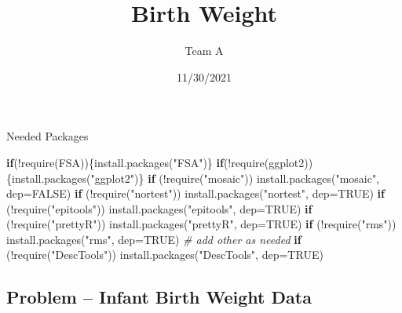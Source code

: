 \documentclass[
]{article}
\title{Birth Weight}
\author{Team A}
\date{11/30/2021}
\newenvironment{Shaded}{\begin{snugshade}}{\end{snugshade}}
\newcommand{\AttributeTok}[1]{\textcolor[rgb]{0.77,0.63,0.00}{#1}}
\newcommand{\CommentTok}[1]{\textcolor[rgb]{0.56,0.35,0.01}{\textit{#1}}}
\newcommand{\ConstantTok}[1]{\textcolor[rgb]{0.00,0.00,0.00}{#1}}
\newcommand{\ControlFlowTok}[1]{\textcolor[rgb]{0.13,0.29,0.53}{\textbf{#1}}}
\newcommand{\FunctionTok}[1]{\textcolor[rgb]{0.00,0.00,0.00}{#1}}
\newcommand{\NormalTok}[1]{#1}
\newcommand{\SpecialCharTok}[1]{\textcolor[rgb]{0.00,0.00,0.00}{#1}}
\newcommand{\StringTok}[1]{\textcolor[rgb]{0.31,0.60,0.02}{#1}}
\begin{document}
\maketitle

Needed Packages

\begin{Shaded}
\begin{Highlighting}[]
\ControlFlowTok{if}\NormalTok{(}\SpecialCharTok{!}\FunctionTok{require}\NormalTok{(FSA))\{}\FunctionTok{install.packages}\NormalTok{(}\StringTok{"FSA"}\NormalTok{)\}}
\ControlFlowTok{if}\NormalTok{(}\SpecialCharTok{!}\FunctionTok{require}\NormalTok{(ggplot2))\{}\FunctionTok{install.packages}\NormalTok{(}\StringTok{"ggplot2"}\NormalTok{)\}}
\ControlFlowTok{if}\NormalTok{ (}\SpecialCharTok{!}\FunctionTok{require}\NormalTok{(}\StringTok{"mosaic"}\NormalTok{)) }\FunctionTok{install.packages}\NormalTok{(}\StringTok{"mosaic"}\NormalTok{, }\AttributeTok{dep=}\ConstantTok{FALSE}\NormalTok{)}
\ControlFlowTok{if}\NormalTok{ (}\SpecialCharTok{!}\FunctionTok{require}\NormalTok{(}\StringTok{"nortest"}\NormalTok{)) }\FunctionTok{install.packages}\NormalTok{(}\StringTok{"nortest"}\NormalTok{, }\AttributeTok{dep=}\ConstantTok{TRUE}\NormalTok{)}
\ControlFlowTok{if}\NormalTok{ (}\SpecialCharTok{!}\FunctionTok{require}\NormalTok{(}\StringTok{"epitools"}\NormalTok{)) }\FunctionTok{install.packages}\NormalTok{(}\StringTok{"epitools"}\NormalTok{, }\AttributeTok{dep=}\ConstantTok{TRUE}\NormalTok{)}
\ControlFlowTok{if}\NormalTok{ (}\SpecialCharTok{!}\FunctionTok{require}\NormalTok{(}\StringTok{"prettyR"}\NormalTok{)) }\FunctionTok{install.packages}\NormalTok{(}\StringTok{"prettyR"}\NormalTok{, }\AttributeTok{dep=}\ConstantTok{TRUE}\NormalTok{)}
\ControlFlowTok{if}\NormalTok{ (}\SpecialCharTok{!}\FunctionTok{require}\NormalTok{(}\StringTok{"rms"}\NormalTok{)) }\FunctionTok{install.packages}\NormalTok{(}\StringTok{"rms"}\NormalTok{, }\AttributeTok{dep=}\ConstantTok{TRUE}\NormalTok{)}
\CommentTok{\# add other as needed}
\ControlFlowTok{if}\NormalTok{ (}\SpecialCharTok{!}\FunctionTok{require}\NormalTok{(}\StringTok{"DescTools"}\NormalTok{)) }\FunctionTok{install.packages}\NormalTok{(}\StringTok{"DescTools"}\NormalTok{, }\AttributeTok{dep=}\ConstantTok{TRUE}\NormalTok{)}
\end{Highlighting}
\end{Shaded}

\hypertarget{problem-infant-birth-weight-data}{%
\subsection{Problem -- Infant Birth Weight
Data}\label{problem-infant-birth-weight-data}}
\end{document}
